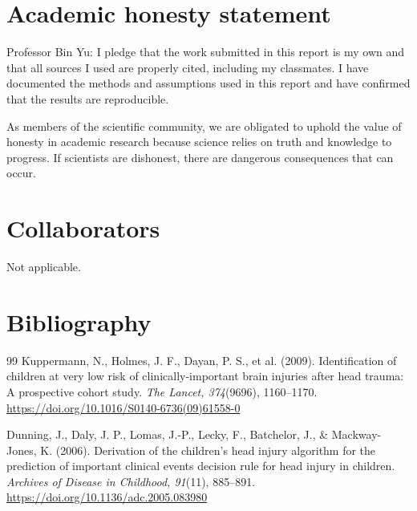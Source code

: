 \documentclass[10pt,letterpaper]{article}
\begin{document}
\section{Academic honesty statement}\label{academic-honesty-statement}

Professor Bin Yu: I pledge that the work submitted in this report is my own and that all sources I used are properly cited, including my classmates. I have documented the methods and assumptions used in this report and have confirmed that the results are reproducible. 

As members of the scientific community,  we are obligated to uphold the value of honesty in academic research because science relies on truth and knowledge to progress. If scientists are dishonest, there are dangerous consequences that can occur.

\section{Collaborators}\label{collaborators}
Not applicable.
\section{Bibliography}\label{bibliography}
\begin{thebibliography}{99}
Kuppermann, N., Holmes, J. F., Dayan, P. S., et al. (2009). Identification of children at very low risk of clinically-important brain injuries after head trauma: A prospective cohort study. \textit{The Lancet, 374}(9696), 1160--1170. \href{https://doi.org/10.1016/S0140-6736(09)61558-0}{https://doi.org/10.1016/S0140-6736(09)61558-0}

Dunning, J., Daly, J. P., Lomas, J.-P., Lecky, F., Batchelor, J., \& Mackway-Jones, K. (2006). Derivation of the children's head injury algorithm for the prediction of important clinical events decision rule for head injury in children. \textit{Archives of Disease in Childhood, 91}(11), 885--891. \href{https://doi.org/10.1136/adc.2005.083980}{https://doi.org/10.1136/adc.2005.083980}

\end{thebibliography}
\end{document}
